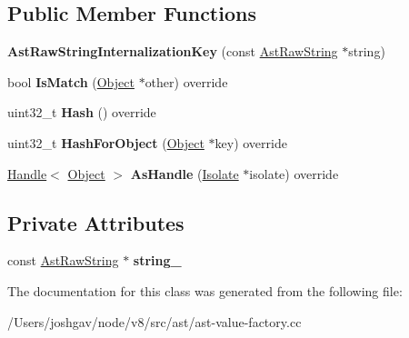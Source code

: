 \subsection*{Public Member Functions}
\begin{DoxyCompactItemize}
\item 
{\bfseries Ast\+Raw\+String\+Internalization\+Key} (const \hyperlink{classv8_1_1internal_1_1_ast_raw_string}{Ast\+Raw\+String} $\ast$string)\hypertarget{classv8_1_1internal_1_1_ast_raw_string_internalization_key_af3086b894b997d1556f3501bcca631e1}{}\label{classv8_1_1internal_1_1_ast_raw_string_internalization_key_af3086b894b997d1556f3501bcca631e1}

\item 
bool {\bfseries Is\+Match} (\hyperlink{classv8_1_1internal_1_1_object}{Object} $\ast$other) override\hypertarget{classv8_1_1internal_1_1_ast_raw_string_internalization_key_a1c607363298ca68d533fd3dfa8fb21f5}{}\label{classv8_1_1internal_1_1_ast_raw_string_internalization_key_a1c607363298ca68d533fd3dfa8fb21f5}

\item 
uint32\+\_\+t {\bfseries Hash} () override\hypertarget{classv8_1_1internal_1_1_ast_raw_string_internalization_key_a173197bf3c4233b638b47cab50f5d87e}{}\label{classv8_1_1internal_1_1_ast_raw_string_internalization_key_a173197bf3c4233b638b47cab50f5d87e}

\item 
uint32\+\_\+t {\bfseries Hash\+For\+Object} (\hyperlink{classv8_1_1internal_1_1_object}{Object} $\ast$key) override\hypertarget{classv8_1_1internal_1_1_ast_raw_string_internalization_key_a8e55471b09116413a565d3171bd955a5}{}\label{classv8_1_1internal_1_1_ast_raw_string_internalization_key_a8e55471b09116413a565d3171bd955a5}

\item 
\hyperlink{classv8_1_1internal_1_1_handle}{Handle}$<$ \hyperlink{classv8_1_1internal_1_1_object}{Object} $>$ {\bfseries As\+Handle} (\hyperlink{classv8_1_1internal_1_1_isolate}{Isolate} $\ast$isolate) override\hypertarget{classv8_1_1internal_1_1_ast_raw_string_internalization_key_a3b0b1b8913f40a5ef7375b3390ebd06e}{}\label{classv8_1_1internal_1_1_ast_raw_string_internalization_key_a3b0b1b8913f40a5ef7375b3390ebd06e}

\end{DoxyCompactItemize}
\subsection*{Private Attributes}
\begin{DoxyCompactItemize}
\item 
const \hyperlink{classv8_1_1internal_1_1_ast_raw_string}{Ast\+Raw\+String} $\ast$ {\bfseries string\+\_\+}\hypertarget{classv8_1_1internal_1_1_ast_raw_string_internalization_key_a783b38b9d49d65d44997f3e6b6f8011e}{}\label{classv8_1_1internal_1_1_ast_raw_string_internalization_key_a783b38b9d49d65d44997f3e6b6f8011e}

\end{DoxyCompactItemize}


The documentation for this class was generated from the following file\+:\begin{DoxyCompactItemize}
\item 
/\+Users/joshgav/node/v8/src/ast/ast-\/value-\/factory.\+cc\end{DoxyCompactItemize}
